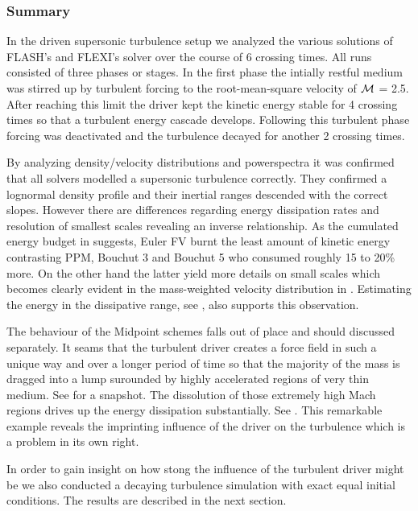 \subsubsection{Summary}
In the driven supersonic turbulence setup we analyzed the various solutions of
FLASH's and FLEXI's solver over the course of 6 crossing times. All runs
consisted of three phases or stages. In the first phase the intially restful
medium was stirred up by turbulent forcing to the root-mean-square velocity
of $\mathcal{M}$ = 2.5. After reaching this limit the driver kept the kinetic
energy stable for 4 crossing times so that a turbulent energy cascade develops. 
Following this turbulent phase forcing was deactivated and the turbulence
decayed for another 2 crossing times.

By analyzing density/velocity distributions and powerspectra it was confirmed
that all solvers modelled a supersonic turbulence correctly. They confirmed a
lognormal density profile and their inertial ranges descended with the correct
slopes. However there are differences regarding energy dissipation rates and
resolution of smallest scales revealing an inverse relationship. As the cumulated
energy budget in 
suggests, Euler FV burnt the least amount of kinetic energy contrasting PPM,
Bouchut 3 and Bouchut 5 who consumed roughly 15 to 20\% more.  On the other
hand the latter yield more details on small scales which becomes clearly
evident in the mass-weighted velocity distribution in
. Estimating the energy in the
dissipative range, see , also supports this observation.

The behaviour of the Midpoint schemes falls out of place and should discussed
separately. It seams that the turbulent driver creates a force field in such a
unique way and over a longer period of time so that the majority of the mass is
dragged into a lump surounded by highly accelerated regions of very thin
medium. See  for a snapshot.
The dissolution of those extremely high Mach regions drives up the energy
dissipation substantially. See
.  This remarkable example
reveals the imprinting influence of the driver on the turbulence which is
a problem in its own right.

In order to gain insight on how stong the influence of the turbulent driver
might be we also conducted a decaying turbulence simulation with exact equal
initial conditions. The results are described in the next section.
